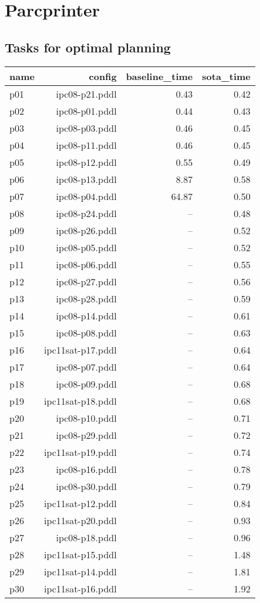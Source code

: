 \documentclass{article}
\begin{document}
                \newpage \section{Parcprinter}
                    \subsection*{Tasks for optimal planning}
                    
                            \begin{center}
                            \scriptsize
                            \begin{tabular}{@{}l|r|r|r@{}}
                            name & config & baseline\_time & sota\_time\\\midrule
                              p01& ipc08-p21.pddl&0.43&0.42\\
  p02& ipc08-p01.pddl&0.44&0.43\\
  p03& ipc08-p03.pddl&0.46&0.45\\
  p04& ipc08-p11.pddl&0.46&0.45\\
  p05& ipc08-p12.pddl&0.55&0.49\\
  p06& ipc08-p13.pddl&8.87&0.58\\
  p07& ipc08-p04.pddl&64.87&0.50\\
  p08& ipc08-p24.pddl&--&0.48\\
  p09& ipc08-p26.pddl&--&0.52\\
  p10& ipc08-p05.pddl&--&0.52\\
  p11& ipc08-p06.pddl&--&0.55\\
  p12& ipc08-p27.pddl&--&0.56\\
  p13& ipc08-p28.pddl&--&0.59\\
  p14& ipc08-p14.pddl&--&0.61\\
  p15& ipc08-p08.pddl&--&0.63\\
  p16& ipc11sat-p17.pddl&--&0.64\\
  p17& ipc08-p07.pddl&--&0.64\\
  p18& ipc08-p09.pddl&--&0.68\\
  p19& ipc11sat-p18.pddl&--&0.68\\
  p20& ipc08-p10.pddl&--&0.71\\
  p21& ipc08-p29.pddl&--&0.72\\
  p22& ipc11sat-p19.pddl&--&0.74\\
  p23& ipc08-p16.pddl&--&0.78\\
  p24& ipc08-p30.pddl&--&0.79\\
  p25& ipc11sat-p12.pddl&--&0.84\\
  p26& ipc11sat-p20.pddl&--&0.93\\
  p27& ipc08-p18.pddl&--&0.96\\
  p28& ipc11sat-p15.pddl&--&1.48\\
  p29& ipc11sat-p14.pddl&--&1.81\\
  p30& ipc11sat-p16.pddl&--&1.92
                            \end{tabular}
                            \end{center}
                    
\end{document}
